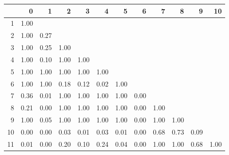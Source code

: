 \begin{tabular}{rrrrrrrrrrrr}
  \hline
 & 0 & 1 & 2 & 3 & 4 & 5 & 6 & 7 & 8 & 9 & 10 \\ 
  \hline
1 & 1.00 &  &  &  &  &  &  &  &  &  &  \\ 
  2 & 1.00 & 0.27 &  &  &  &  &  &  &  &  &  \\ 
  3 & 1.00 & 0.25 & 1.00 &  &  &  &  &  &  &  &  \\ 
  4 & 1.00 & 0.10 & 1.00 & 1.00 &  &  &  &  &  &  &  \\ 
  5 & 1.00 & 1.00 & 1.00 & 1.00 & 1.00 &  &  &  &  &  &  \\ 
  6 & 1.00 & 1.00 & 0.18 & 0.12 & 0.02 & 1.00 &  &  &  &  &  \\ 
  7 & 0.36 & 0.01 & 1.00 & 1.00 & 1.00 & 1.00 & 0.00 &  &  &  &  \\ 
  8 & 0.21 & 0.00 & 1.00 & 1.00 & 1.00 & 1.00 & 0.00 & 1.00 &  &  &  \\ 
  9 & 1.00 & 0.05 & 1.00 & 1.00 & 1.00 & 1.00 & 0.00 & 1.00 & 1.00 &  &  \\ 
  10 & 0.00 & 0.00 & 0.03 & 0.01 & 0.03 & 0.01 & 0.00 & 0.68 & 0.73 & 0.09 &  \\ 
  11 & 0.01 & 0.00 & 0.20 & 0.10 & 0.24 & 0.04 & 0.00 & 1.00 & 1.00 & 0.68 & 1.00 \\ 
   \hline
\end{tabular}

